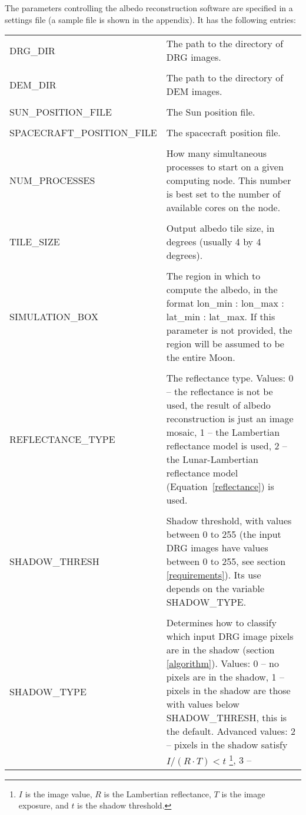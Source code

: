 \documentclass[letterpaper,fleqn,11pt]{report}
\begin{document}
The parameters controlling the albedo reconstruction software are specified in a
settings file (a sample file is shown in the appendix). It has the following entries:

\begin{longtable}{ l p{7cm} }
DRG\_DIR & The path to the directory of DRG images. \\
\\
DEM\_DIR & The path to the directory of DEM images. \\
\\
SUN\_POSITION\_FILE  & The Sun position file.  \\
\\
SPACECRAFT\_POSITION\_FILE & The spacecraft position file.  \\
\\
NUM\_PROCESSES & How many simultaneous processes to start on a given
computing node. This number is best set to the number of available cores on
the node. \\
\\
TILE\_SIZE & Output albedo tile size, in degrees (usually 4 by 4 degrees). \\
\\
SIMULATION\_BOX &         The region in which to compute the albedo, in
the format lon\_min : lon\_max : lat\_min : lat\_max. If this
parameter is not provided, the region will be assumed to be the entire Moon. \\
\\
REFLECTANCE\_TYPE &
The reflectance type. Values: 0 -- the reflectance is not
be used, the result of albedo reconstruction is just an image mosaic, 1 --
the Lambertian reflectance model is used, 2 -- the Lunar-Lambertian
reflectance model (Equation~\ref{reflectance}) is used.\\
\\
SHADOW\_THRESH    &         
 Shadow threshold, with values between 0 to 255 (the input DRG images
 have values between 0 to 255, see section \ref{requirements}). Its use depends on the variable SHADOW\_TYPE.
\\
\\
SHADOW\_TYPE & Determines how to classify which input DRG image pixels are in
the shadow (section \ref{algorithm}). Values: 0 -- no pixels are in
the shadow, 1 -- pixels in the shadow are those with values below
SHADOW\_THRESH, this is the default. Advanced values: 2 -- pixels in the
shadow satisfy $I/(R\cdot T) < t$ \footnote{$I$ is the
image value, $R$ is the Lambertian reflectance, $T$ is the image
exposure, and $t$ is the shadow threshold.}, 3 -- 

\end{longtable}
\end{document}
